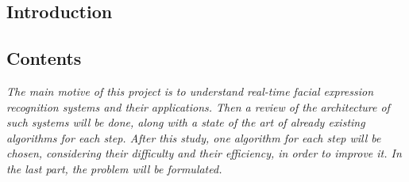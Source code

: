   \begin{titlepage}
    \vspace*{\fill}
      \part{Introduction}
    \vspace*{\fill}
  \end{titlepage}

\chapter*{Contents}

\textit{The main motive of this project is to understand real-time facial expression recognition systems and their applications. Then a review of the architecture of such systems will be done, along with a state of the art of already existing algorithms for each step. After this study, one algorithm for each step will be chosen, considering their difficulty and their efficiency, in order to improve it. In the last part, the problem will be formulated.}
\pagebreak


\newpage



